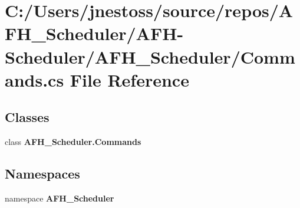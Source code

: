 \section{C\+:/\+Users/jnestoss/source/repos/\+A\+F\+H\+\_\+\+Scheduler/\+A\+F\+H-\/\+Scheduler/\+A\+F\+H\+\_\+\+Scheduler/\+Commands.cs File Reference}
\label{_commands_8cs}
\subsection*{Classes}
\begin{DoxyCompactItemize}
\item 
class \textbf{ A\+F\+H\+\_\+\+Scheduler.\+Commands}
\end{DoxyCompactItemize}
\subsection*{Namespaces}
\begin{DoxyCompactItemize}
\item 
namespace \textbf{ A\+F\+H\+\_\+\+Scheduler}
\end{DoxyCompactItemize}
